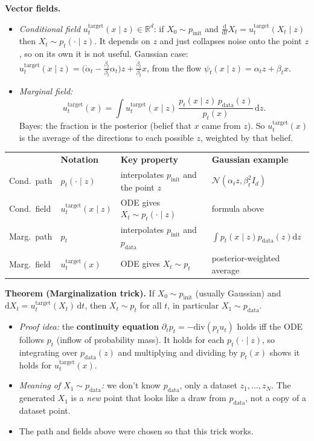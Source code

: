 \documentclass{article}
\newcommand{\R}{\mathbb{R}}
\newcommand{\pinit}{p_{\mathrm{init}}}
\newcommand{\pdata}{p_{\mathrm{data}}}
\newcommand{\Id}{I_d}
\newcommand{\utar}{u_t^{\mathrm{target}}}
\newcommand{\dd}{\mathrm{d}}
\newcommand{\Normal}{\mathcal{N}}
\begin{document}
\textbf{Vector fields.}
\begin{itemize}
  \item \emph{Conditional field} $\utar(x\mid z)\in\R^d$: if $X_0\sim\pinit$ and $\frac{\dd}{\dd t}X_t=\utar(X_t\mid z)$ then $X_t\sim p_t(\cdot\mid z)$. It depends on $z$ and just collapses noise onto the point $z$, so on its own it is not useful. Gaussian case: $\utar(x\mid z)=\big(\dot\alpha_t-\tfrac{\dot\beta_t}{\beta_t}\alpha_t\big)z+\tfrac{\dot\beta_t}{\beta_t}x$, from the flow $\psi_t(x\mid z)=\alpha_t z+\beta_t x$.
  \item \emph{Marginal field:}
  \[
    \utar(x)=\int \utar(x\mid z)\,\frac{p_t(x\mid z)\,\pdata(z)}{p_t(x)}\,\dd z .
  \]
  Bayes: the fraction is the posterior (belief that $x$ came from $z$). So $\utar(x)$ is the average of the directions to each possible $z$, weighted by that belief.
\end{itemize}
 
\begin{tabular}{@{}l l l l@{}}
  & \textbf{Notation} & \textbf{Key property} & \textbf{Gaussian example} \\
  Cond.\ path & $p_t(\cdot\mid z)$ & interpolates $\pinit$ and the point $z$ & $\Normal(\alpha_t z,\beta_t^2\Id)$ \\
  Cond.\ field & $\utar(x\mid z)$ & ODE gives $X_t\sim p_t(\cdot\mid z)$ & formula above \\
  Marg.\ path & $p_t$ & interpolates $\pinit$ and $\pdata$ & $\int p_t(x\mid z)\pdata(z)\dd z$ \\
  Marg.\ field & $\utar(x)$ & ODE gives $X_t\sim p_t$ & posterior-weighted average \\
\end{tabular}
 
\textbf{Theorem (Marginalization trick).} If $X_0\sim\pinit$ (usually Gaussian) and $\dd X_t=\utar(X_t)\,\dd t$, then $X_t\sim p_t$ for all $t$, in particular $X_1\sim\pdata$.
\begin{itemize}
  \item \emph{Proof idea:} the \textbf{continuity equation} $\partial_t p_t=-\mathrm{div}(p_t u_t)$ holds iff the ODE follows $p_t$ (inflow of probability mass). It holds for each $p_t(\cdot\mid z)$, so integrating over $\pdata(z)$ and multiplying and dividing by $p_t(x)$ shows it holds for $\utar(x)$.
  \item \emph{Meaning of $X_1\sim\pdata$:} we don't know $\pdata$, only a dataset $z_1,\dots,z_N$. The generated $X_1$ is a \emph{new} point that looks like a draw from $\pdata$, not a copy of a dataset point.
  \item The path and fields above were chosen so that this trick works.
\end{itemize}
 
\end{document}
